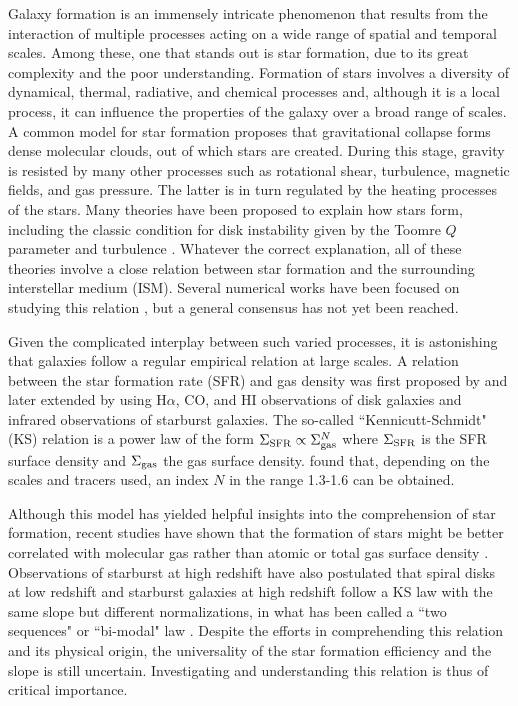 \documentclass[twocolumn]{aastex}
\newcommand{\ssfr}{\Sigma_{\rm SFR}}
\newcommand{\sgas}{\Sigma_{\rm gas}}
\begin{document}
Galaxy formation is an immensely intricate phenomenon that results from the interaction of multiple processes acting on a wide range of spatial and temporal scales. Among these, one that stands out is star formation, due to its great complexity and the poor understanding. Formation of stars involves a diversity of dynamical, thermal, radiative, and chemical processes and, although it is a local process, it can influence the properties of the galaxy over a broad range of scales. A common model for star formation proposes that gravitational collapse forms dense molecular clouds, out of which stars are created. During this stage, gravity is resisted by many other processes such as rotational shear, turbulence, magnetic fields, and gas pressure. The latter is in turn regulated by the heating processes of the stars. Many theories have been proposed to explain how stars form, including the classic condition for disk instability given by the Toomre $Q$ parameter \citep{Toomre_64, K89, Boissier_03, Heyer_04} and turbulence \citep{Sellwood_99, Kritsuk_02, Wada_02, MacLow_04}. Whatever the correct explanation, all of these theories involve a close relation between star formation and the surrounding interstellar medium (ISM). Several numerical works have been focused on studying this relation \citep{Wada_01, Elmegreen_02, Wada_07,Wang_Abel_09}, but a general consensus has not yet been reached.

Given the complicated interplay between such varied processes, it is astonishing that galaxies follow a regular empirical relation at large scales. A relation between the star formation rate (SFR) and gas density was first proposed by \citet{Schmidt_59} and later extended by \citet{K98} using H$\alpha$, CO, and HI observations of disk galaxies and infrared observations of starburst galaxies. The so-called ``Kennicutt-Schmidt" (KS) relation is a power law of the form $\ssfr \propto \sgas^N$ where $\ssfr$ is the SFR surface density and $\sgas$ the gas surface density. \citet{K98} found that, depending on the scales and tracers used, an index $N$ in the range 1.3-1.6 can be obtained.

Although this model has yielded helpful insights into the comprehension of star formation, recent studies have shown that the formation of stars might be better correlated with molecular gas rather than atomic or total gas surface density \citep{Wong_02, Kennicutt_07, Bigiel_08}. Observations of starburst at high redshift have also postulated that spiral disks at low redshift and starburst galaxies at high redshift follow a KS law with the same slope but different normalizations, in what has been called a ``two sequences" or ``bi-modal" law \citep{Daddi_10, Genzel_10}. Despite the efforts in comprehending this relation and its physical origin, the universality of the star formation efficiency and the slope is still uncertain. Investigating and understanding this relation is thus of critical importance.
\end{document}
